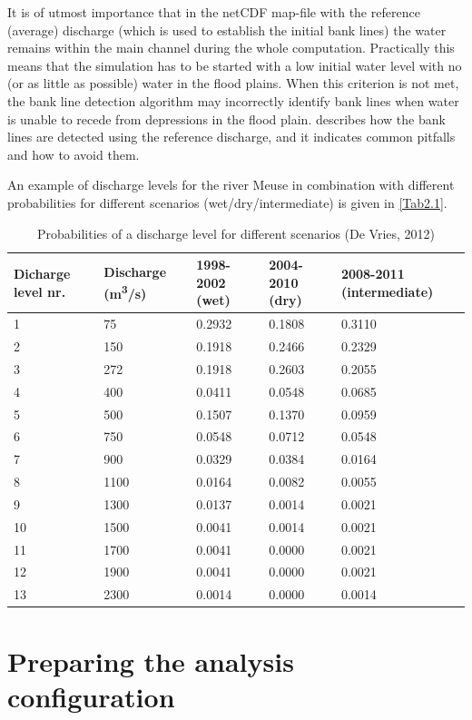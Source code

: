 \Note It is of utmost importance that in the netCDF map-file with the reference (average) discharge (which is used to establish the initial bank lines) the water remains within the main channel during the whole computation.
Practically this means that the simulation has to be started with a low initial water level with no (or as little as possible) water in the flood plains.
When this criterion is not met, the bank line detection algorithm may incorrectly identify bank lines when water is unable to recede from depressions in the flood plain.
 describes how the bank lines are detected using the reference discharge, and it indicates common pitfalls and how to avoid them.

An example of discharge levels for the river Meuse in combination with different probabilities for different scenarios (wet/dry/intermediate) is given in \autoref{Tab2.1}.

\begin{table}
\center
\begin{tabular}{p{2cm}p{2cm}p{2cm}p{2cm}p{2cm}}
Dicharge level nr. & Discharge (m\textsuperscript{3}/s) & 1998-2002 (wet) & 2004-2010 (dry) & 2008-2011 (intermediate) \\ \hline
1 & 75 & 0.2932 & 0.1808 & 0.3110 \\
2 & 150 & 0.1918 & 0.2466 & 0.2329 \\
3 & 272 & 0.1918 & 0.2603 & 0.2055 \\
4 & 400 & 0.0411 & 0.0548 & 0.0685 \\
5 & 500 & 0.1507 & 0.1370 & 0.0959 \\
6 & 750 & 0.0548 & 0.0712 & 0.0548 \\
7 & 900 & 0.0329 & 0.0384 & 0.0164 \\
8 & 1100 & 0.0164 & 0.0082 & 0.0055 \\
9 & 1300 & 0.0137 & 0.0014 & 0.0021 \\
10 & 1500 & 0.0041 & 0.0014 & 0.0021 \\
11 & 1700 & 0.0041 & 0.0000 & 0.0021 \\
12 & 1900 & 0.0041 & 0.0000 & 0.0021 \\
13 & 2300 & 0.0014 & 0.0000 & 0.0014 \\ \hline
\end{tabular}
\caption{Probabilities of a discharge level for different scenarios (De Vries, 2012)}
\label{Tab2.1}
\end{table}

\section{Preparing the analysis configuration} \label{Sec:Prepare}

